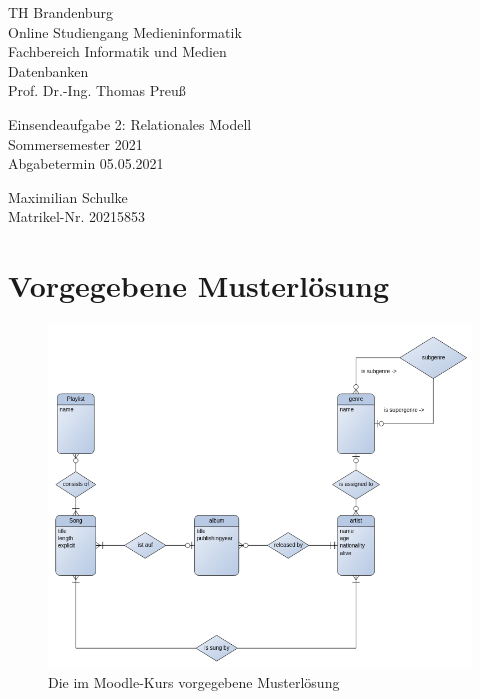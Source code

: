 \documentclass{article}
\begin{document}
\begin{titlepage}
	\begin{flushleft}
		TH Brandenburg \\
		Online Studiengang Medieninformatik \\
		Fachbereich Informatik und Medien \\
		Datenbanken \\
		Prof. Dr.-Ing. Thomas Preuß
	\end{flushleft}

	\vfill

	\begin{center}
		\Large{Einsendeaufgabe 2: Relationales Modell}\\[0.5em]
		\large{Sommersemester 2021}\\[0.25em]
		\large{Abgabetermin 05.05.2021}
	\end{center}

	\vfill

	\begin{flushright}
		Maximilian Schulke \\
		Matrikel-Nr. 20215853
	\end{flushright}
\end{titlepage}

\newpage

\section{Vorgegebene Musterlösung}

\begin{figure}[h!]
	\includegraphics[width=\textwidth]{er.jpg}
	\centering
	\caption{Die im Moodle-Kurs vorgegebene Musterlösung}
\end{figure}
\end{document}
